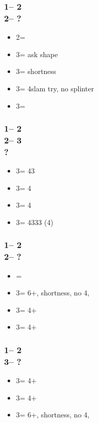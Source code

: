 \documentclass[12pt, a4paper]{report}
\begin{document}
{{        \subsubsection*{1\nt -- 2\clubs\\
                        2\spades -- ?}
        \begin{itemize}
            \item 2\nt = \inv
            \item 3\clubs = ask shape
            \item 3\diams = \minor shortness
            \item 3\hearts = 4\spades slam try, no splinter
            \item 3\spades = \inv
        \end{itemize}

        \subsubsection*{1\nt -- 2\clubs\\
                        2\major -- 3\clubs\\
                        ?}
        \begin{itemize}
            \item 3\diams = 43\minor
            \item 3\hearts = 4\clubs
            \item 3\spades = 4\diams
            \item 3\nt = 4333 (4\major)
        \end{itemize}

        \subsubsection*{1\nt -- 2\clubs\\
                        2\nt -- ?}
        \begin{itemize}
            \item \pass = \inv\ \bal
            \item 3\clubs = 6+\diams, \clubs shortness, no 4\major, \gf
            \item 3\diams = 4+\hearts
            \item 3\hearts = 4+\spades
        \end{itemize}

        \subsubsection*{1\nt -- 2\clubs\\
                        3\clubs -- ?}
        \begin{itemize}
            \item 3\diams = 4+\hearts
            \item 3\hearts = 4+\spades
            \item 3\spades = 6+\diams, \clubs shortness, no 4\major, \gf
        \end{itemize}

}}
\end{document}
